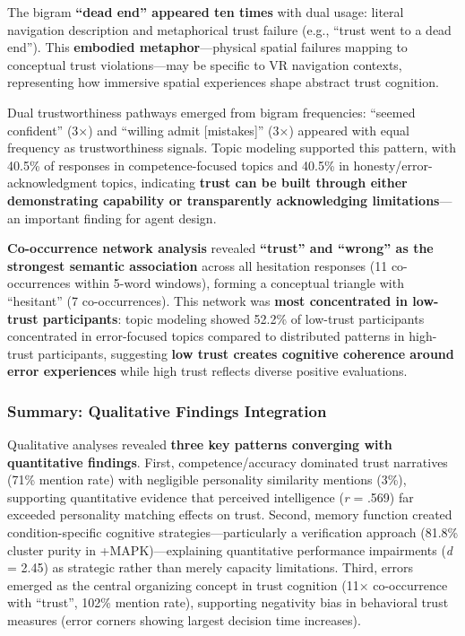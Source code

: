 \documentclass[12pt]{article}
\begin{document}
The bigram \textbf{``dead end'' appeared ten times} with dual usage: literal navigation description and metaphorical trust failure (e.g., ``trust went to a dead end''). This \textbf{embodied metaphor}---physical spatial failures mapping to conceptual trust violations---may be specific to VR navigation contexts, representing how immersive spatial experiences shape abstract trust cognition.

Dual trustworthiness pathways emerged from bigram frequencies: ``seemed confident'' (3×) and ``willing admit [mistakes]'' (3×) appeared with equal frequency as trustworthiness signals. Topic modeling supported this pattern, with 40.5\% of responses in competence-focused topics and 40.5\% in honesty/error-acknowledgment topics, indicating \textbf{trust can be built through either demonstrating capability or transparently acknowledging limitations}---an important finding for agent design.

\textbf{Co-occurrence network analysis} revealed \textbf{``trust'' and ``wrong'' as the strongest semantic association} across all hesitation responses (11 co-occurrences within 5-word windows), forming a conceptual triangle with ``hesitant'' (7 co-occurrences). This network was \textbf{most concentrated in low-trust participants}: topic modeling showed 52.2\% of low-trust participants concentrated in error-focused topics compared to distributed patterns in high-trust participants, suggesting \textbf{low trust creates cognitive coherence around error experiences} while high trust reflects diverse positive evaluations.

\subsubsection{Summary: Qualitative Findings Integration}

Qualitative analyses revealed \textbf{three key patterns converging with quantitative findings}. First, competence/accuracy dominated trust narratives (71\% mention rate) with negligible personality similarity mentions (3\%), supporting quantitative evidence that perceived intelligence (\textit{r} = .569) far exceeded personality matching effects on trust. Second, memory function created condition-specific cognitive strategies—particularly a verification approach (81.8\% cluster purity in +MAPK)—explaining quantitative performance impairments (\textit{d} = 2.45) as strategic rather than merely capacity limitations. Third, errors emerged as the central organizing concept in trust cognition (11× co-occurrence with ``trust'', 102\% mention rate), supporting negativity bias in behavioral trust measures (error corners showing largest decision time increases).
\end{document}

